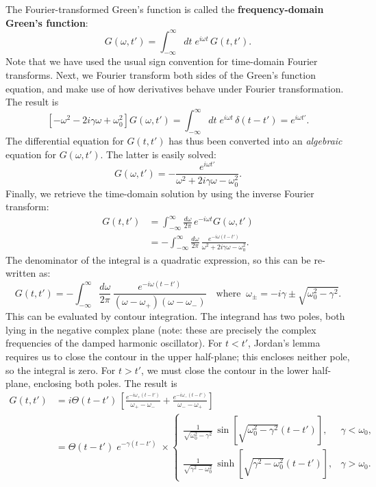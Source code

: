 \documentclass[10pt,a4paper]{article}
\begin{document}
The Fourier-transformed Green's function is called the
\textbf{frequency-domain Green's function}:
\begin{equation}
G(\omega, t') = \int_{-\infty}^\infty dt \; e^{i\omega t}\, G(t,t').
\end{equation}
Note that we have used the usual sign convention for time-domain
Fourier transforms. Next, we Fourier transform both sides of the
Green's function equation, and make use of how derivatives behave
under Fourier transformation. The result is
\begin{equation}
\left[- \omega^2 - 2i \gamma\omega + \omega_0^2\right] G(\omega,t') = \int_{-\infty}^\infty dt \; e^{i\omega t}\, \delta(t-t') = e^{i\omega t'}.
\end{equation}
The differential equation for $G(t,t')$ has thus been converted into
an \emph{algebraic} equation for $G(\omega,t')$. The latter is easily
solved:
\begin{equation}
G(\omega, t') = - \frac{e^{i\omega t'}}{\omega^2 + 2i\gamma\omega - \omega_0^2}.
\end{equation}
Finally, we retrieve the time-domain solution by using the inverse
Fourier transform:
\begin{align}
  G(t,t') &= \int_{-\infty}^\infty \frac{d\omega}{2\pi} \, e^{-i\omega t} G(\omega, t')  \\&= - \int_{-\infty}^\infty \frac{d\omega}{2\pi} \, \frac{e^{-i\omega (t-t')}}{\omega^2 + 2i\gamma\omega - \omega_0^2}.
\end{align}
The denominator of the integral is a quadratic expression, so this can
be re-written as:
\begin{equation}
G(t,t') = - \int_{-\infty}^\infty \frac{d\omega}{2\pi} \, \frac{e^{-i\omega (t-t')}}{(\omega - \omega_+)(\omega - \omega_-)} \quad\mathrm{where}\;\; \omega_{\pm} = -i\gamma \pm \sqrt{\omega_0^2-\gamma^2}.
\end{equation}
This can be evaluated by contour integration. The integrand has two
poles, both lying in the negative complex plane (note: these are
precisely the complex frequencies of the damped harmonic
oscillator). For $t < t'$, Jordan's lemma requires us to close the
contour in the upper half-plane; this encloses neither pole, so the
integral is zero. For $t > t'$, we must close the contour in the lower
half-plane, enclosing both poles. The result is
\begin{align}G(t,t') &= i \Theta(t-t') \, \left[ \frac{e^{-i\omega_+ (t-t')}}{\omega_+ - \omega_-
    } + \frac{e^{-i\omega_- (t-t')}}{\omega_- - \omega_+}\right] \\ &= \Theta(t-t') \;e^{-\gamma(t-t')} \; \times \left\{\begin{array}{ll} \frac{1}{\sqrt{\omega_0^2-\gamma^2}}\, \sin\left[\sqrt{\omega_0^2-\gamma^2} (t-t')\right], & \gamma < \omega_0, \\ \frac{1}{\sqrt{\gamma^2-\omega_0^2}}\, \sinh\left[\sqrt{\gamma^2-\omega_0^2} (t-t')\right], & \gamma > \omega_0.\end{array}\right. \label{gsol}
\end{align}
\end{document}
